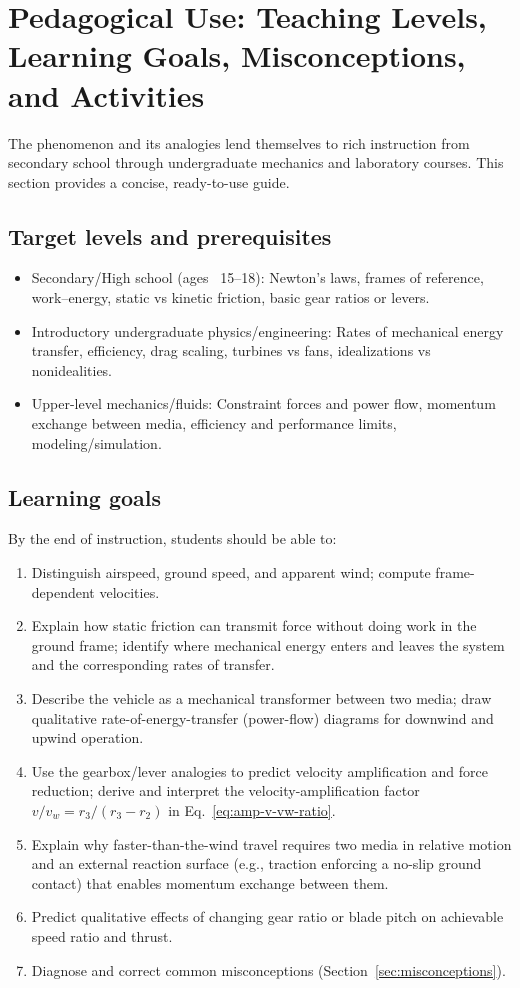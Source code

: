 \documentclass[a4paper]{article}
\begin{document}
\section{Pedagogical Use: Teaching Levels, Learning Goals, Misconceptions, and Activities}
\label{sec:pedagogy}

The phenomenon and its analogies lend themselves to rich instruction from secondary school through undergraduate mechanics and laboratory courses. This section provides a concise, ready-to-use guide.

\subsection{Target levels and prerequisites}

\begin{itemize}
\item Secondary/High school (ages ~15--18): Newton's laws, frames of reference, work--energy, static vs kinetic friction, basic gear ratios or levers.
\item Introductory undergraduate physics/engineering: Rates of mechanical energy transfer, efficiency, drag scaling, turbines vs fans, idealizations vs nonidealities.
\item Upper-level mechanics/fluids: Constraint forces and power flow, momentum exchange between media, efficiency and performance limits, modeling/simulation.
\end{itemize}

\subsection{Learning goals}

By the end of instruction, students should be able to:
\begin{enumerate}
\item Distinguish airspeed, ground speed, and apparent wind; compute frame-dependent velocities.
\item Explain how static friction can transmit force without doing work in the ground frame; identify where mechanical energy enters and leaves the system and the corresponding rates of transfer.
\item Describe the vehicle as a mechanical transformer between two media; draw qualitative rate-of-energy-transfer (power-flow) diagrams for downwind and upwind operation.
\item Use the gearbox/lever analogies to predict velocity amplification and force reduction; derive and interpret the velocity-amplification factor $v/v_w = r_3/(r_3-r_2)$ in Eq.~\eqref{eq:amp-v-vw-ratio}.
\item Explain why faster-than-the-wind travel requires two media in relative motion and an external reaction surface (e.g., traction enforcing a no-slip ground contact) that enables momentum exchange between them.
\item Predict qualitative effects of changing gear ratio or blade pitch on achievable speed ratio and thrust.
\item Diagnose and correct common misconceptions (Section~\ref{sec:misconceptions}).
\end{enumerate}
\end{document}
